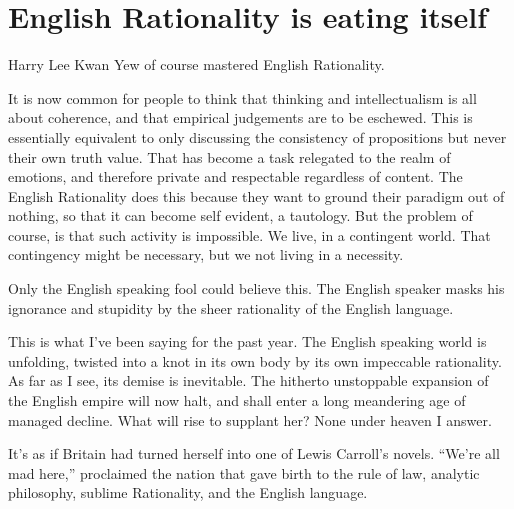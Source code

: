 \chapter{English Rationality is eating itself}

Harry Lee Kwan Yew of course mastered English Rationality.


It is now common for people to think that thinking and intellectualism is all about coherence, and that empirical judgements are to be eschewed. This is essentially equivalent to only discussing the consistency of propositions but never their own truth value. That has become a task relegated to the realm of emotions, and therefore private and respectable regardless of content. The English Rationality does this because they want to ground their paradigm out of nothing, so that it can become self evident, a tautology. But the problem of course, is that such activity is impossible. We live, in a contingent world. That contingency might be necessary, but we not living in a necessity. 


Only the English speaking fool could believe this. The English speaker masks his ignorance and stupidity by the sheer rationality of the English language. 



This is what I’ve been saying for the past year. The English speaking world is unfolding, twisted into a knot in its own body by its own impeccable rationality. As far as I see, its demise is inevitable. The hitherto unstoppable expansion of the English empire will now halt, and shall enter a long meandering age of managed decline. What will rise to supplant her? None under heaven I answer. 


It’s as if Britain had turned herself into one of Lewis Carroll’s novels. “We’re all mad here,” proclaimed the nation that gave birth to the rule of law, analytic philosophy, sublime Rationality, and the English language. 